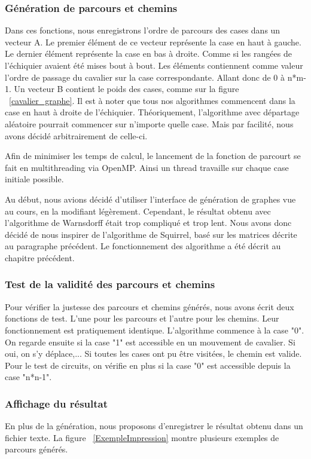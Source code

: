 \subsubsection{Génération de parcours et chemins}
Dans ces fonctions, nous enregistrons l'ordre de parcours des cases dans un vecteur A. Le premier élément de ce vecteur représente la case en haut à gauche. Le dernier élément représente la case en bas à droite. Comme si les rangées de l'échiquier avaient été mises bout à bout. Les éléments contiennent comme valeur l'ordre de passage du cavalier sur la case correspondante. Allant donc de 0 à n*m-1. Un vecteur B contient le poids des cases, comme sur la figure ~\ref{cavalier_graphe}. Il est à noter que tous nos algorithmes commencent dans la case en haut à droite de l'échiquier. Théoriquement, l'algorithme avec départage aléatoire pourrait commencer sur n'importe quelle case. Mais par facilité, nous avons décidé arbitrairement de celle-ci.

Afin de minimiser les temps de calcul, le lancement de la fonction de parcourt se fait en multithreading via OpenMP. Ainsi un thread travaille sur chaque case initiale possible.

Au début, nous avions décidé d'utiliser l'interface de génération de graphes vue au cours, en la modifiant légèrement. Cependant, le résultat obtenu avec l'algorithme de Warnsdorff était trop compliqué et trop lent. Nous avons donc décidé de nous inspirer de l'algorithme de Squirrel, basé sur les matrices décrite au paragraphe précédent.
Le fonctionnement des algorithme a été décrit au chapitre précédent. 

\subsubsection{Test de la validité des parcours et chemins}
Pour vérifier la justesse des parcours et chemins générés, nous avons écrit deux fonctions de test. L'une pour les parcours et l'autre pour les chemins. Leur fonctionnement est pratiquement identique. L'algorithme commence à la case "0". On regarde ensuite si la case "1" est accessible en un mouvement de cavalier. Si oui, on s'y déplace,... Si toutes les cases ont pu être visitées, le chemin est valide. Pour le test de circuits, on vérifie en plus si la case "0" est accessible depuis la case "n*n-1".

\subsubsection{Affichage du résultat}
En plus de la génération, nous proposons d'enregistrer le résultat obtenu dans un fichier texte. La figure ~\ref{ExempleImpression} montre plusieurs exemples de parcours générés.

